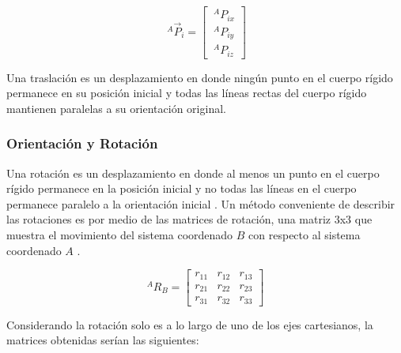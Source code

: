 \begin{equation}
    ~^{A}\vec{P}_i = \left[\begin{array}{c} ~^{A}P_{ix} \\ ~^{A}P_{iy} \\ ~^{A}P_{iz} \end{array}\right]
\end{equation}

Una traslación es un desplazamiento en donde ningún punto en el cuerpo rígido permanece en su posición inicial y todas las líneas rectas del cuerpo rígido mantienen paralelas a su orientación original.

\subsubsection*{Orientación y Rotación}
Una rotación es un desplazamiento en donde al menos un punto en el cuerpo rígido permanece en la posición inicial y no todas las líneas en el cuerpo permanece paralelo a la orientación inicial \citep{waldron2016kinematics}. Un método conveniente de describir las rotaciones es por medio de las matrices de rotación, una matriz 3x3 que muestra el movimiento del sistema coordenado $B$ con respecto al sistema coordenado $A$ \citep{taghirad2013parallel}.

\begin{equation}
    ^{A}R_{B} = \left[ \begin{array}{ccc}
        r_{11} & r_{12} & r_{13}  \\
        r_{21} & r_{22} & r_{23}  \\
        r_{31} & r_{32} & r_{33}
    \end{array} \right]
\end{equation}

Considerando la rotación solo es a lo largo de uno de los ejes cartesianos, la matrices obtenidas serían las siguientes:

